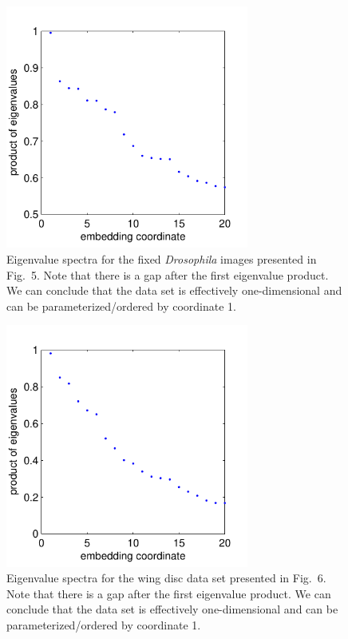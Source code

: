 \documentclass[10pt,twocolumn]{article}
\newcommand{\fig}[0]{Fig.}
\begin{document}
\begin{figure}
\includegraphics[width=8cm]{drosophila_fixed_eval_spectrum}
\caption{Eigenvalue spectra for the fixed {\em Drosophila} images presented in \fig~5. Note that there is a gap after the first eigenvalue product. We can conclude that the data set is effectively one-dimensional and can be parameterized/ordered by coordinate 1.}
\end{figure}

\begin{figure}
\includegraphics[width=8cm]{wing_disc_eval_spectrum}
\caption{Eigenvalue spectra for the wing disc data set presented in \fig~6. Note that there is a gap after the first eigenvalue product. We can conclude that the data set is effectively one-dimensional and can be parameterized/ordered by coordinate 1.}
\end{figure}
\end{document}
